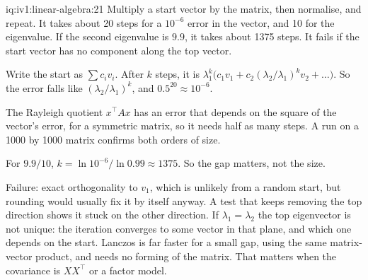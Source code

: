 \begin{solution}{iq:iv1:linear-algebra:21}
Multiply a start vector by the matrix, then normalise, and repeat. It takes about 20 steps for a $10^{-6}$ error in the vector, and 10 for the eigenvalue. If the second eigenvalue is $9.9$, it takes about 1375 steps. It fails if the start vector has no component along the top vector.

Write the start as $\sum c_iv_i$. After $k$ steps, it is $\lambda_1^k\bigl(c_1v_1 + c_2(\lambda_2/\lambda_1)^kv_2 + \dots\bigr)$. So the error falls like $(\lambda_2/\lambda_1)^k$, and $0.5^{20} \approx 10^{-6}$.

The Rayleigh quotient $x^\top Ax$ has an error that depends on the square of the vector's error, for a symmetric matrix, so it needs half as many steps. A run on a 1000 by 1000 matrix confirms both orders of size.

For $9.9/10$, $k = \ln 10^{-6}/\ln 0.99 \approx 1375$. So the gap matters, not the size.

Failure: exact orthogonality to $v_1$, which is unlikely from a random start, but rounding would usually fix it by itself anyway. A test that keeps removing the top direction shows it stuck on the other direction. If $\lambda_1 = \lambda_2$ the top eigenvector is not unique: the iteration converges to some vector in that plane, and which one depends on the start. Lanczos is far faster for a small gap, using the same matrix-vector product, and needs no forming of the matrix. That matters when the covariance is $XX^\top$ or a factor model.

\end{solution}

